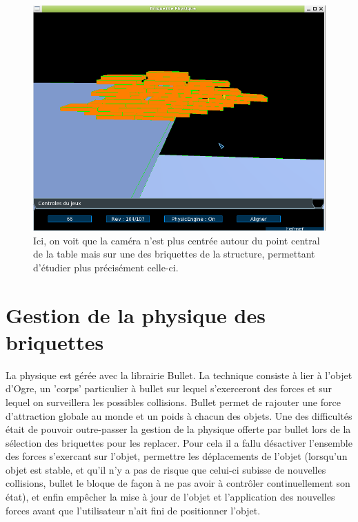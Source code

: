 \documentclass[frenchb,twoside]{EPURapport}
\begin{document}
    \begin{figure}[h]
		\centering
        \includegraphics[width=12cm]{images/bon_score.png}
        \caption{\label{fig:bon_score}Ici, on voit que la caméra n'est plus
        centrée autour du point
        central de la table mais sur une des briquettes de la structure,
        permettant d'étudier plus précisément celle-ci.}
    \end{figure}

    \section{Gestion de la physique des briquettes}
        La physique est gérée avec la librairie Bullet. La technique consiste à
        lier à l'objet d'Ogre, un 'corps' particulier à bullet sur lequel
        s'exerceront des forces et sur lequel on surveillera les possibles
        collisions. Bullet permet de rajouter une force d'attraction globale au
        monde et un poids à chacun des objets. Une des difficultés était de
        pouvoir outre-passer la gestion de la physique offerte par bullet lors
        de la sélection des briquettes pour les replacer. Pour cela il a fallu
        désactiver l'ensemble des forces s'exercant sur l'objet, permettre les
        déplacements de l'objet (lorsqu'un objet est stable, et qu'il n'y a pas
        de risque que celui-ci subisse de nouvelles collisions, bullet le bloque
        de façon à ne pas avoir à contrôler continuellement son état), et enfin
        empêcher la mise à jour de l'objet et l'application des nouvelles
        forces avant que l'utilisateur n'ait fini de positionner l'objet. 
\end{document}
